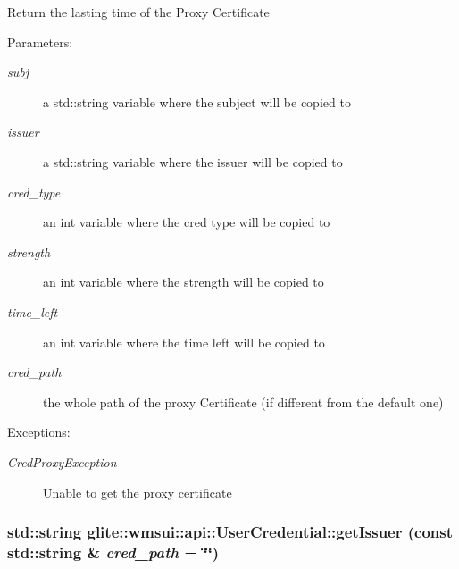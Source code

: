 Return the lasting time of the Proxy Certificate \begin{Desc}
\item[Parameters:]
\begin{description}
\item[{\em subj}]a std::string variable where the subject will be copied to \item[{\em issuer}]a std::string variable where the issuer will be copied to \item[{\em cred\_\-type}]an int variable where the cred type will be copied to \item[{\em strength}]an int variable where the strength will be copied to \item[{\em time\_\-left}]an int variable where the time left will be copied to \item[{\em cred\_\-path}]the whole path of the proxy Certificate (if different from the default one) \end{description}
\end{Desc}
\begin{Desc}
\item[Exceptions:]
\begin{description}
\item[{\em Cred\-Proxy\-Exception}]Unable to get the proxy certificate\end{description}
\end{Desc}
\hypertarget{classglite_1_1wmsui_1_1api_1_1UserCredential_a2}{
\subsubsection[getIssuer]{\setlength{\rightskip}{0pt plus 5cm}std::string glite::wmsui::api::User\-Credential::get\-Issuer (const std::string \& {\em cred\_\-path} = \char`\"{}\char`\"{})}}
\label{classglite_1_1wmsui_1_1api_1_1UserCredential_a2}



